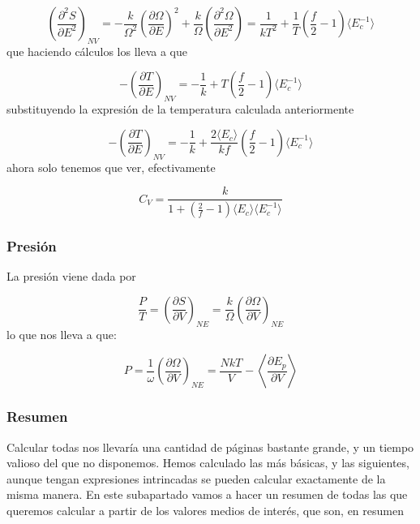 \documentclass[11pt]{article} %
\newcommand{\parentesis}[1]{\left( #1  \right)}
\newcommand{\parciales}[2]{\frac{\partial #1}{\partial #2}}
\begin{document}
\begin{equation}
	\parentesis{\parciales{^2S}{E^2}}_{NV} =  -\frac{k}{\Omega^2} \parentesis{\parciales{\Omega}{E}}^2 + \frac{k}{\Omega} \parentesis{\parciales{^2 \Omega}{E^2}} = \frac{1}{kT^2} + \frac{1}{T}\parentesis{\frac{f}{2}-1} \langle E_c^{-1} \rangle
\end{equation}
que haciendo cálculos los lleva a que 

\begin{equation}
	-\parentesis{\parciales{T}{E}}_{NV} = - \frac{1}{k} + T \parentesis{\frac{f}{2}-1} \langle E_c^{-1}\rangle
\end{equation}
substituyendo la expresión de la temperatura calculada anteriormente

\begin{equation}
	-\parentesis{\parciales{T}{E}}_{NV} = - \frac{1}{k} + \frac{2\langle E_c \rangle}{kf} \parentesis{\frac{f}{2}-1} \langle E_c^{-1}\rangle
\end{equation}
ahora solo tenemos que ver, efectivamente 

\begin{equation}
	C_V  = \frac{k}{1+\parentesis{\frac{2}{f}-1} \langle E_c \rangle \langle E_c^{-1}\rangle}
\end{equation}

\subsubsection{Presión}

La presión viene dada por 

\begin{equation}
	\frac{P}{T} = \parentesis{\parciales{S}{V}}_{NE} = 
	\frac{k}{\Omega} \parentesis{\parciales{\Omega}{V}}_{NE} 
\end{equation}	
lo que nos lleva a que:

\begin{equation}
	P = \frac{1}{\omega} \parentesis{\parciales{\Omega}{V}}_{NE}  = \frac{NkT}{V} - \left\langle \parciales{E_p}{V} \right\rangle
\end{equation}



\subsubsection{Resumen}

Calcular todas nos llevaría una cantidad de páginas bastante grande, y un tiempo valioso del que no disponemos. Hemos calculado las más básicas, y las siguientes, aunque tengan expresiones intrincadas se pueden calcular exactamente de la misma manera. En este subapartado vamos a hacer un resumen de todas las que queremos calcular a partir de los valores medios de interés, que son, en resumen
\end{document}

